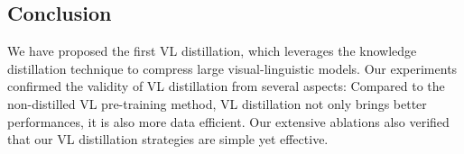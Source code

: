 





\subsection{Conclusion}
We have proposed the first VL distillation, which leverages the knowledge distillation technique to compress large visual-linguistic models. Our experiments confirmed the validity of VL distillation from several aspects: Compared to the non-distilled VL pre-training method, VL distillation not only brings better performances, it is also more data efficient. Our extensive ablations also verified that our VL distillation strategies are simple yet effective.

